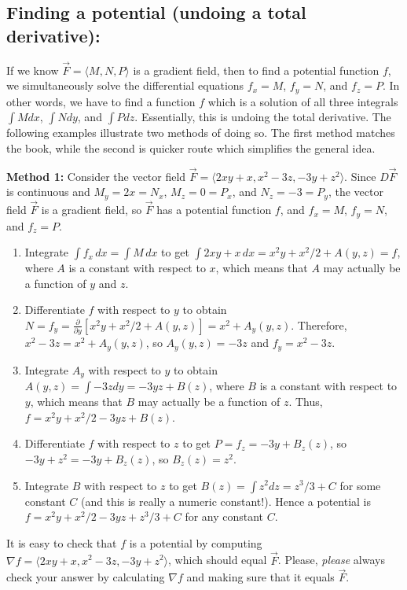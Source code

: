 \subsection{Finding a potential (undoing a total derivative):} If we know
$\vec F=\langle M,N,P\rangle$ is a gradient field, then to find a potential
function $f$, we simultaneously solve the differential equations
$f_x=M$, $f_y=N$, and $f_z=P$.  In other words, we have to find a
function $f$ which is a solution of all three integrals $\int Mdx$, $\int
Ndy$, and $\int Pdz$.  Essentially, this is undoing the total
derivative. The following examples illustrate two methods of doing so.
The first method matches the book, while the second is quicker route which
simplifies the general idea.

\textbf{Method 1:} Consider the vector field $\vec
F=\langle2xy+x,x^2-3z,-3y+z^2\rangle$. Since $D\vec F$ is continuous and
$M_y=2x=N_x$, $M_z=0=P_x$, and $N_z=-3=P_y$, the vector field $\vec F$ is a
gradient field, so $\vec F$ has a potential function $f$, and $f_x=M$, $f_y=N$, and $f_z=P$.
\begin{enumerate}
\item Integrate $\int f_x\,dx=\int M\,dx$ to get $\int 2xy+x\,dx =
  x^2y+x^2/2+A(y,z)=f$, where $A$ is a constant with respect to $x$,
  which means that $A$ may actually be a function of $y$ and $z$.
\item Differentiate $f$ with respect to $y$ to obtain
  $N=f_y=\frac{\partial}{\partial y}[x^2y+x^2/2+A(y,z)] = x^2+A_y(y,z)$. Therefore,
  $x^2-3z=x^2+A_y(y,z)$, so $A_y(y,z)= -3z$ and $f_y=x^2-3z$.
\item Integrate $A_y$ with respect to $y$ to obtain $A(y,z)=\int -3z dy =
  -3yz+B(z)$, where $B$ is a constant with respect to $y$, which means
  that $B$ may actually be a function of $z$.  Thus,
  $f=x^2y+x^2/2-3yz+B(z)$.
\item Differentiate $f$ with respect to $z$ to get $P=f_z=-3y+B_z(z)$,
  so $-3y+z^2=-3y+B_z(z)$, so $B_z(z)=z^2$.
\item Integrate $B$ with respect to $z$ to get $B(z)=\int z^2 dz =
  z^3/3+C$ for some constant $C$ (and this is really a numeric
  constant!).  Hence a potential is $f= x^2y+x^2/2-3yz+z^3/3+C$ for
  any constant $C$.
\end{enumerate}

It is easy to check that $f$ is a potential by computing $\nabla f =
\langle2xy+x,x^2-3z,-3y+z^2\rangle$, which should equal $\vec F$.
Please, \emph{please} always check your answer by calculating $\nabla
f$ and making sure that it equals $\vec F$.

